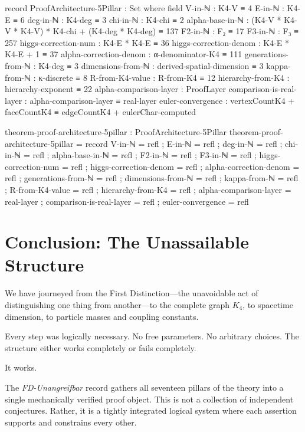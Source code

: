 \documentclass[11pt,a4paper]{book}
\begin{document}
\begin{code}
record ProofArchitecture-5Pillar : Set where
  field
    V-in-ℕ   : K4-V ≡ 4
    E-in-ℕ   : K4-E ≡ 6
    deg-in-ℕ : K4-deg ≡ 3
    chi-in-ℕ : K4-chi ≡ 2
    alpha-base-in-ℕ : (K4-V * K4-V * K4-V) * K4-chi + (K4-deg * K4-deg) ≡ 137
    F2-in-ℕ  : F₂ ≡ 17
    F3-in-ℕ  : F₃ ≡ 257
    higgs-correction-num   : K4-E * K4-E ≡ 36
    higgs-correction-denom : K4-E * K4-E + 1 ≡ 37
    alpha-correction-denom : α-denominator-K4 ≡ 111
    generations-from-ℕ     : K4-deg ≡ 3
    dimensions-from-ℕ      : derived-spatial-dimension ≡ 3
    kappa-from-ℕ           : κ-discrete ≡ 8
    R-from-K4-value        : R-from-K4 ≡ 12
    hierarchy-from-K4      : hierarchy-exponent ≡ 22
    alpha-comparison-layer   : ProofLayer
    comparison-is-real-layer : alpha-comparison-layer ≡ real-layer
    euler-convergence : vertexCountK4 + faceCountK4 ≡ edgeCountK4 + eulerChar-computed

theorem-proof-architecture-5pillar : ProofArchitecture-5Pillar
theorem-proof-architecture-5pillar = record
  { V-in-ℕ   = refl
  ; E-in-ℕ   = refl
  ; deg-in-ℕ = refl
  ; chi-in-ℕ = refl
  ; alpha-base-in-ℕ = refl
  ; F2-in-ℕ  = refl
  ; F3-in-ℕ  = refl
  ; higgs-correction-num   = refl
  ; higgs-correction-denom = refl
  ; alpha-correction-denom = refl
  ; generations-from-ℕ     = refl
  ; dimensions-from-ℕ      = refl
  ; kappa-from-ℕ           = refl
  ; R-from-K4-value        = refl
  ; hierarchy-from-K4      = refl
  ; alpha-comparison-layer   = real-layer
  ; comparison-is-real-layer = refl
  ; euler-convergence = refl
  }
\end{code}

\chapter{Conclusion: The Unassailable Structure}
\label{chap:conclusion}

We have journeyed from the First Distinction---the unavoidable act of distinguishing one thing from another---to the complete graph $K_4$, to spacetime dimension, to particle masses and coupling constants.

Every step was logically necessary. No free parameters. No arbitrary choices. The structure either works completely or fails completely.

It works.

The \emph{FD-Unangreifbar} record gathers all seventeen pillars of the theory into a single mechanically verified proof object.
This is not a collection of independent conjectures. Rather, it is a tightly integrated logical system where each assertion supports and constrains every other.
\end{document}
